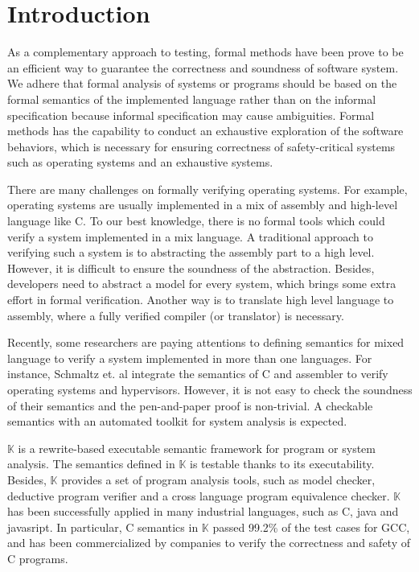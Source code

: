 \documentclass[letterpaper, 10 pt, conference]{IEEEtran}
\begin{document}
\section{Introduction}
\par As a complementary approach to testing, formal methods have been prove to be an efficient way to  guarantee the correctness and soundness of software system.
We adhere that formal analysis of systems or programs should be based on the formal semantics of the implemented language rather than on the informal specification because informal specification may cause ambiguities.
 Formal methods has the capability to conduct an exhaustive exploration of the software behaviors, which is necessary for ensuring correctness of safety-critical systems such as operating systems and an exhaustive systems.

 There are many challenges on formally verifying operating systems. For example, operating systems are usually implemented in a mix of assembly and high-level language like C. To our best knowledge, there is no formal tools which could verify a system implemented in a mix language. A traditional approach to verifying such a system is to abstracting the assembly part to a high level. However, it is difficult to ensure the soundness of the abstraction. Besides, developers need to abstract a model for every system, which brings some extra effort in formal verification. Another way is to translate high level language to assembly, where a fully verified compiler (or translator) is necessary.

 Recently, some researchers are paying attentions to defining semantics for mixed language to verify a system implemented in more than one languages. For instance, Schmaltz et. al \cite{} integrate the semantics of C and assembler to verify operating systems and hypervisors. However, it is not easy to check the soundness of their semantics and the pen-and-paper proof is non-trivial. A checkable semantics with an automated toolkit for system analysis is expected.

 $\mathbb{K}$ is a rewrite-based executable semantic framework for program or system analysis. The semantics defined in $\mathbb{K}$ is testable thanks to its executability. Besides, $\mathbb{K}$ provides a set of program analysis tools, such as model checker, deductive
 program verifier and a cross language program
 equivalence checker. $\mathbb{K}$ has been successfully applied in many industrial languages, such as C, java and javasript. In particular, C semantics in $\mathbb{K}$ passed 99.2\% of the test cases for GCC, and has been commercialized by companies to verify the correctness and safety of C programs.
\end{document}
